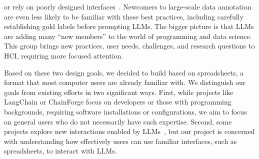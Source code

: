 or rely on poorly designed interfaces~\cite{fowler2023frustration}. %
Newcomers to large-scale data annotation are even less likely to be familiar with these best practices, including carefully establishing gold labels before prompting LLMs.
The bigger picture is that LLMs are adding many ``new members'' to the world of programming and data science.
This group brings new practices, user needs, challenges, and research questions to HCI, requiring more focused attention.

\sloppy
Based on these two design goals, we decided to build \system based on spreadsheets, a format that most computer users are already familiar with.
We distinguish our goals from existing efforts in two significant ways. 
First, while projects like LangChain or ChainForge focus on developers or those with programming backgrounds, requiring software installations or configurations, we aim to focus on general users who do not necessarily have such expertise. 
Second, some projects explore new interactions enabled by LLMs~\cite{10.1145/3586183.3606833}, but our project is concerned with understanding how effectively users can use familiar interfaces, such as spreadsheets, to interact with LLMs.


\begin{comment}
  


At the practical level, users with little or no programming background might be more likely to prompt in the dark. 
In contrast, individuals familiar with software engineering practices are accustomed to using existing frameworks or tools, where automatic testing---such as unit and integration testing---is standard.
These users have more experience as well as technological support for creating gold labels for testing.
At a deeper level, what is happening is that LLMs bring many people with limited or no programming skills into the realm of data science or programming tasks.
This group of people brings new and interesting challenges and research questions to HCI and thus deserves more attention.


  
\end{comment}